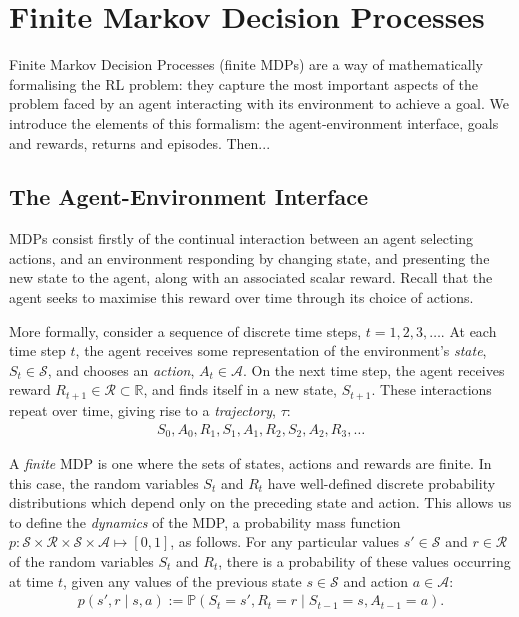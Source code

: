 \documentclass[11pt, a4paper, bibliography=totoc]{report}
\newcommand{\reals}{\mathbb{R}}
\renewcommand{\P}[1]{\mathbb{P}\left( #1 \right) }
\begin{document}
\section{Finite Markov Decision Processes}
Finite Markov Decision Processes (finite MDPs) are a way of mathematically formalising the RL problem: they capture the most important aspects of the problem faced by an agent interacting with its environment to achieve a goal. We introduce the elements of this formalism: the agent-environment interface, goals and rewards, returns and episodes. Then...

\subsection{The Agent-Environment Interface} \label{subsection:agent_env_interface}
MDPs consist firstly of the continual interaction between an agent selecting actions, and an environment responding by changing state, and presenting the new state to the agent, along with an associated scalar reward. Recall that the agent seeks to maximise this reward over time through its choice of actions.

More formally, consider a sequence of discrete time steps, $t = 1,2,3, \dots$. At each time step $t$, the agent receives some representation of the environment's \textit{state}, $ S_t \in \mathcal{S} $, and chooses an \textit{action}, $ A_t \in \mathcal{A} $. On the next time step, the agent receives reward $ R_{t+1} \in \mathcal{R} \subset \reals $, and finds itself in a new state, $ S_{t+1} $. These interactions repeat over time, giving rise to a \textit{trajectory}, $ \tau $:
\begin{align*}
S_0, A_0, R_1, S_1, A_1, R_2, S_2, A_2, R_3, \dots
\end{align*}

A \textit{finite} MDP is one where the sets of states, actions and rewards are finite. In this case, the random variables $ S_t $ and $ R_t $ have well-defined discrete probability distributions which depend only on the preceding state and action. This allows us to define the \textit{dynamics} of the MDP, a probability mass function $ p : \mathcal{S} \times \mathcal{R} \times \mathcal{S} \times \mathcal{A} \mapsto [0,1] $, as follows. For any particular values $ s' \in \mathcal{S} $ and $ r \in \mathcal{R} $ of the random variables $ S_t $ and $ R_t $, there is a probability of these values occurring at time $ t $, given any values of the previous state $ s \in \mathcal{S} $ and action $ a \in \mathcal{A} $:
\begin{align*}
p(s', r \mid s, a) := \P{S_t = s', R_t = r \mid S_{t-1} = s , A_{t-1} = a }.
\end{align*}
\end{document}
